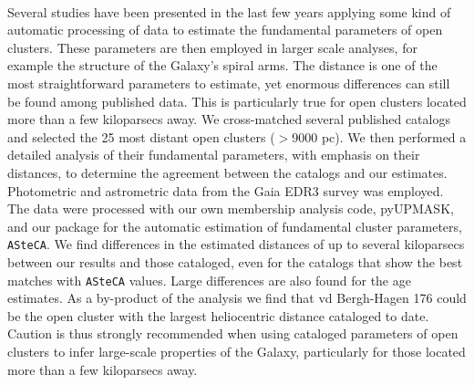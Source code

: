 \documentclass{aa}
\begin{document}
\abstract
{\\Several studies have been presented in the last few years applying some kind of
automatic processing of data to estimate the fundamental parameters of open
clusters. These parameters are then employed in larger scale analyses, for
example the structure of the Galaxy's spiral arms.
The distance is one of the most straightforward parameters to estimate, yet
enormous differences can still be found among published data. This is
particularly true for open clusters located more than a few kiloparsecs away.}
{
We cross-matched several published catalogs and selected the 25 most
distant open clusters ($>$9000 pc). We then performed a detailed analysis of
their fundamental parameters, with emphasis on their distances, to determine the
agreement between the  catalogs and our estimates.}
{Photometric and astrometric data from the Gaia EDR3 survey was employed. The
data were processed with our own membership analysis code, pyUPMASK, and our
package for the automatic estimation of  fundamental cluster parameters, \texttt{ASteCA}.}
{We find differences in the estimated distances of up to several kiloparsecs
between our results and those cataloged, even for the catalogs that show the
best matches with \texttt{ASteCA} values. Large differences are also found for
the age estimates. As a by-product of the analysis we find that
vd Bergh-Hagen 176 could be the open cluster with the largest heliocentric
distance cataloged to date.}
{Caution is thus strongly recommended when using cataloged parameters of open
clusters to infer large-scale properties of the Galaxy, particularly for those
located more than a few kiloparsecs away.}

\end{document}
